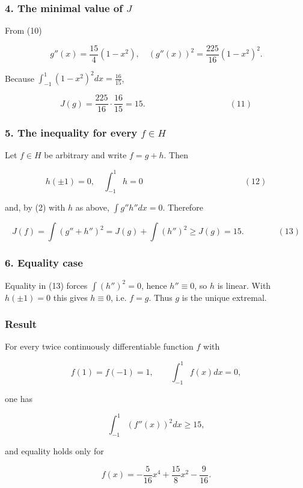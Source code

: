 \documentclass[12pt,a4paper]{article}
\theoremstyle{definition}
\begin{document}
    \hrulefill
    \subsubsection*{4. The minimal value of $J$}
    \hrulefill

    From (10)

    $$g''(x)=\frac{15}{4}(1-x^2),\quad (g''(x))^2=\frac{225}{16}(1-x^2)^2.$$

    Because $\int_{-1}^{1}(1-x^2)^2dx = \frac{16}{15}$,

    $$J(g)=\frac{225}{16}\cdot\frac{16}{15}=15. \qquad\qquad\qquad\qquad\qquad (11)$$

    \hrulefill
    \subsubsection*{5. The inequality for every $f\in H$}
    \hrulefill

    Let $f\in H$ be arbitrary and write $f = g + h$.  Then

    $$h(\pm1)=0,\quad\int_{-1}^{1}h=0 \qquad\qquad\qquad\qquad\qquad\qquad (12)$$

    and, by (2) with $h$ as above, $\int g''h''dx = 0$.  Therefore

    $$J(f)=\int(g''+h'')^2 = J(g)+\int(h'')^2 \geq J(g)=15. \qquad\qquad (13)$$

    \hrulefill
    \subsubsection*{6. Equality case}
    \hrulefill

    Equality in (13) forces $\int(h'')^2=0$, hence $h''\equiv 0$, so $h$ is linear.
    With $h(\pm1)=0$ this gives $h\equiv 0$, i.e. $f=g$.  Thus $g$ is the unique extremal.

    \hrulefill
    \subsubsection*{Result}
    \hrulefill

    For every twice continuously differentiable function $f$ with

    $$f(1)=f(-1)=1,\quad\quad\int_{-1}^{1}f(x)dx = 0,$$

    one has

    $$\int_{-1}^{1}(f''(x))^2dx \geq 15,$$

    and equality holds only for

    $$f(x)= -\frac{5}{16}x^{4} + \frac{15}{8}x^{2} - \frac{9}{16}.$$
\end{document}
